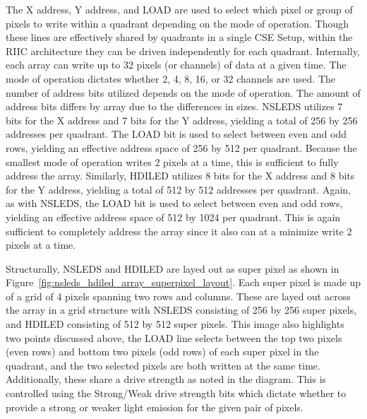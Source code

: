     The X address, Y address, and LOAD are used to select which pixel or group of pixels to write within a quadrant depending on the mode of operation. Though these lines are effectively shared by quadrants in a single CSE Setup, within the RIIC architecture they can be driven independently for each quadrant. Internally, each array can write up to 32 pixels (or channels) of data at a given time. The mode of operation dictates whether 2, 4, 8, 16, or 32 channels are used. The number of address bits utilized depends on the mode of operation. The amount of address bits differs by array due to the differences in sizes. NSLEDS utilizes 7 bits for the X address and 7 bits for the Y address, yielding a total of 256 by 256 addresses per quadrant. The LOAD bit is used to select between even and odd rows, yielding an effective address space of 256 by 512 per quadrant. Because the smallest mode of operation writes 2 pixels at a time, this is sufficient to fully address the array. Similarly, HDILED utilizes 8 bits for the X address and 8 bits for the Y address, yielding a total of 512 by 512 addresses per quadrant. Again, as with NSLEDS, the LOAD bit is used to select between even and odd rows, yielding an effective address space of 512 by 1024 per quadrant. This is again sufficient to completely address the array since it also can at a minimize write 2 pixels at a time.

    Structurally, NSLEDS and HDILED are layed out as super pixel as shown in Figure~\ref{fig:nsleds_hdiled_array_superpixel_layout}. Each super pixel is made up of a grid of 4 pixels spanning two rows and columns. These are layed out across the array in a grid structure with NSLEDS consisting of 256 by 256 super pixels, and HDILED consisting of 512 by 512 super pixels. This image also highlights two points discussed above, the LOAD line selects between the top two pixels (even rows) and bottom two pixels (odd rows) of each super pixel in the quadrant, and the two selected pixels are both written at the same time. Additionally, these share a drive strength as noted in the diagram. This is controlled using the Strong/Weak drive strength bits which dictate whether to provide a strong or weaker light emission for the given pair of pixels.

